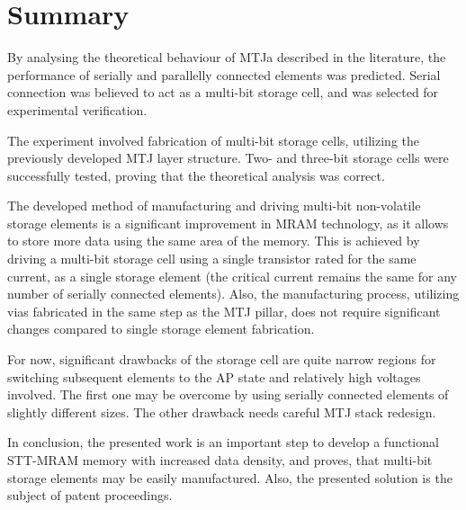 \chapter{Summary}
\label{sec:Summary}

    By analysing the theoretical behaviour of MTJa described in the literature, the performance of serially and parallelly connected elements was predicted. Serial connection was believed to act as a multi-bit storage cell, and was selected for experimental verification.

    The experiment involved fabrication of multi-bit storage cells, utilizing the previously developed MTJ layer structure. Two- and three-bit storage cells were successfully tested, proving that the theoretical analysis was correct.
    
    The developed method of manufacturing and driving multi-bit non-volatile storage elements is a significant improvement in MRAM technology, as it allows to store more data using the same area of the memory. This is achieved by driving a multi-bit storage cell using a single transistor rated for the same current, as a single storage element (the critical current remains the same for any number of serially connected elements). Also, the manufacturing process, utilizing vias fabricated in the same step as the MTJ pillar, does not require significant changes compared to single storage element fabrication.
    
    For now, significant drawbacks of the storage cell are quite narrow regions for switching subsequent elements to the AP state and relatively high voltages involved. The first one may be overcome by using serially connected elements of slightly different sizes. The other drawback needs careful MTJ stack redesign.
    
    In conclusion, the presented work is an important step to develop a functional STT-MRAM memory with increased data density, and proves, that multi-bit storage elements may be easily manufactured. Also, the presented solution is the subject of patent proceedings.
    